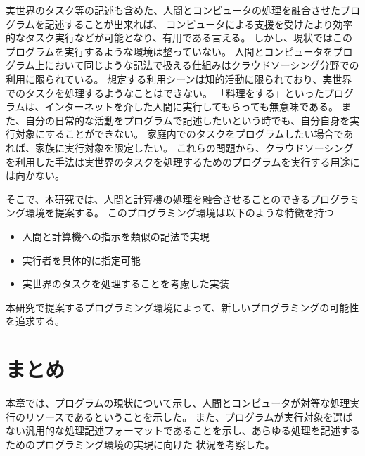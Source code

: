実世界のタスク等の記述も含めた、人間とコンピュータの処理を融合させたプログラムを記述することが出来れば、
コンピュータによる支援を受けたより効率的なタスク実行などが可能となり、有用である言える。
しかし、現状ではこのプログラムを実行するような環境は整っていない。
人間とコンピュータをプログラム上において同じような記法で扱える仕組みはクラウドソーシング分野での利用に限られている。
想定する利用シーンは知的活動に限られており、実世界でのタスクを処理するようなことはできない。
「料理をする」といったプログラムは、インターネットを介した人間に実行してもらっても無意味である。
また、自分の日常的な活動をプログラムで記述したいという時でも、自分自身を実行対象にすることができない。
家庭内でのタスクをプログラムしたい場合であれば、家族に実行対象を限定したい。
これらの問題から、クラウドソーシングを利用した手法は実世界のタスクを処理するためのプログラムを実行する用途には向かない。

そこで、本研究では、人間と計算機の処理を融合させることのできるプログラミング環境を提案する。
このプログラミング環境は以下のような特徴を持つ

\begin{itemize}
\itemsep1pt\parskip0pt
\item
  人間と計算機への指示を類似の記法で実現
\item
  実行者を具体的に指定可能
\item
  実世界のタスクを処理することを考慮した実装
\end{itemize}

本研究で提案するプログラミング環境によって、新しいプログラミングの可能性を追求する。

\section{まとめ}\label{ux307eux3068ux3081}

本章では、プログラムの現状について示し、人間とコンピュータが対等な処理実行のリソースであるということを示した。
また、プログラムが実行対象を選ばない汎用的な処理記述フォーマットであることを示し、あらゆる処理を記述するためのプログラミング環境の実現に向けた
状況を考察した。
